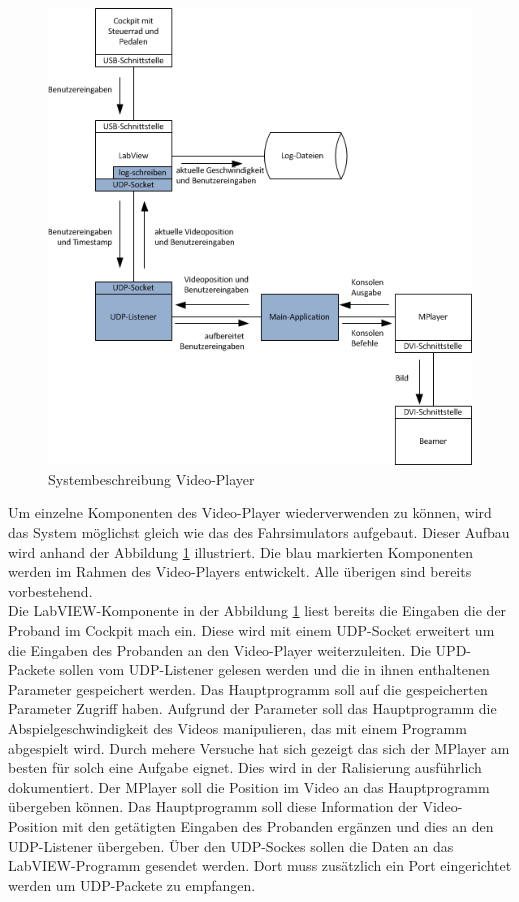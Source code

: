 \begin{figure}[H]
\centering 
\includegraphics{src/Systembeschreibung_VideoPlayer.png}
\caption{Systembeschreibung Video-Player} %
\label{Systembeschreibung Video-Player} %
\end{figure}
Um einzelne Komponenten des Video-Player wiederverwenden zu können, wird das System möglichst gleich wie das des Fahrsimulators aufgebaut. Dieser Aufbau wird anhand der Abbildung \ref{Systembeschreibung Video-Player} illustriert.  Die blau markierten Komponenten werden im Rahmen des Video-Players entwickelt. Alle überigen sind bereits vorbestehend. \\
Die LabVIEW-Komponente in der Abbildung \ref{Systembeschreibung Video-Player} liest bereits die Eingaben die der Proband im Cockpit mach ein. Diese wird mit einem UDP-Socket erweitert um die Eingaben des Probanden an den Video-Player weiterzuleiten. Die UPD-Packete sollen vom UDP-Listener gelesen werden und die in ihnen enthaltenen Parameter gespeichert werden. Das Hauptprogramm soll auf die gespeicherten Parameter Zugriff haben. Aufgrund der Parameter soll das Hauptprogramm die Abspielgeschwindigkeit des Videos manipulieren, das mit einem Programm abgespielt wird. Durch mehere Versuche hat sich gezeigt das sich der MPlayer am besten für solch eine Aufgabe eignet. Dies wird in der Ralisierung ausführlich dokumentiert. Der MPlayer soll die Position im Video an das Hauptprogramm übergeben können. Das Hauptprogramm soll diese Information der Video-Position mit den getätigten Eingaben des Probanden ergänzen und dies an den UDP-Listener übergeben. Über den UDP-Sockes sollen die Daten an das LabVIEW-Programm gesendet werden. Dort muss zusätzlich ein Port eingerichtet werden um UDP-Packete zu empfangen. 

